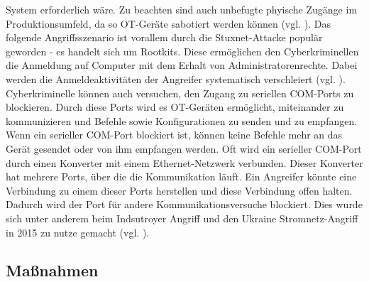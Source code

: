 System erforderlich wäre. Zu beachten sind auch unbefugte phyische Zugänge im Produktionsumfeld, da so OT-Geräte sabotiert werden können (vgl. \cite{mitre}). Das folgende Angriffsszenario ist vorallem durch die Stuxnet-Attacke populär geworden - es handelt sich um Rootkits. Diese ermöglichen den Cyberkriminellen die Anmeldung auf Computer mit dem Erhalt von Administratorenrechte. Dabei werden die Anmeldeaktivitäten der Angreifer systematisch verschleiert (vgl. \cite{Gdata}). Cyberkriminelle können auch versuchen, den Zugang zu seriellen COM-Ports zu blockieren. Durch diese Ports wird es OT-Geräten ermöglicht, miteinander zu kommunizieren und Befehle sowie Konfigurationen zu senden und zu empfangen. Wenn ein serieller COM-Port blockiert ist, können keine Befehle mehr an das Gerät gesendet oder von ihm empfangen werden. Oft wird ein serieller COM-Port durch einen Konverter mit einem Ethernet-Netzwerk verbunden. Dieser Konverter hat mehrere Ports, über die die Kommunikation läuft. Ein Angreifer könnte eine Verbindung zu einem dieser Ports herstellen und diese Verbindung offen halten. Dadurch wird der Port für andere Kommunikationsversuche blockiert. Dies wurde sich unter anderem beim Indsutroyer Angriff und den Ukraine Stromnetz-Angriff in 2015 zu nutze gemacht (vgl. \cite{mitre}).


\subsection{Maßnahmen}



